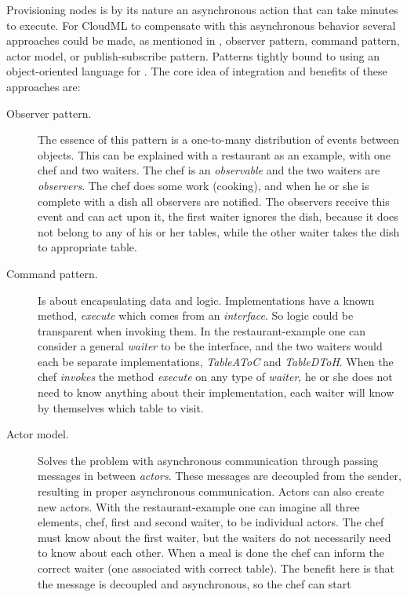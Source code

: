 Provisioning nodes is by its nature an asynchronous action that can take minutes to execute.
For CloudML to compensate with this asynchronous behavior several approaches could be made,
as mentioned in , \ie observer pattern, command pattern, actor model,
or publish-subscribe pattern.
Patterns tightly bound to using an object-oriented language for .
The core idea of integration and benefits of these approaches are:
\begin{description}
  \item[Observer pattern.] The essence of this pattern is a one-to-many distribution of events between objects.
    This can be explained with a restaurant as an example, with one chef and two waiters.
    The chef is an \emph{observable} and the two waiters are \emph{observers}.
    The chef does some work (cooking), and when he or she is complete with a dish all observers are notified.
    The observers receive this event and can act upon it, 
    \eg the first waiter ignores the dish, because it does not belong to any of his or her tables, 
    while the other waiter takes the dish to appropriate table.
  \item[Command pattern.] Is about encapsulating data and logic. 
    Implementations have a known method, \eg \emph{execute} which comes from an \emph{interface}.
    So logic could be transparent when invoking them.
    In the restaurant-example one can consider a general \emph{waiter} to be the interface,
    and the two waiters would each be separate implementations, 
    \eg \emph{TableAToC} and \emph{TableDToH}.
    When the chef \emph{invokes} the method \emph{execute} on any type of \emph{waiter}, 
    he or she does not need to know anything about their implementation, 
    each waiter will know by themselves which table to visit.
  \item[Actor model.] Solves the problem with asynchronous communication through passing messages
    in between \emph{actors}.
    These messages are decoupled from the sender, resulting in proper asynchronous communication.
    Actors can also create new actors.
    With the restaurant-example one can imagine all three elements, \ie chef, first and second waiter,
    to be individual actors.
    The chef must know about the first waiter, 
    but the waiters do not necessarily need to know about each other.
    When a meal is done the chef can inform the correct waiter (one associated with correct table).
    The benefit here is that the message is decoupled and asynchronous, so the chef can start

\end{description}
